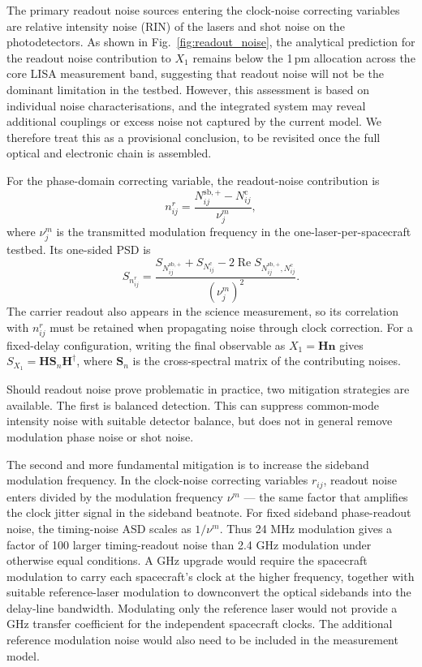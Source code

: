 


The primary readout noise sources entering the clock-noise correcting variables are relative intensity noise (RIN) of the lasers and shot noise on the photodetectors. As shown in Fig.~\ref{fig:readout_noise}, the analytical prediction for the readout noise contribution to $X_1$ remains below the 1\,pm allocation across the core LISA measurement band, suggesting that readout noise will not be the dominant limitation in the testbed. However, this assessment is based on individual noise characterisations, and the integrated system may reveal additional couplings or excess noise not captured by the current model. We therefore treat this as a provisional conclusion, to be revisited once the full optical and electronic chain is assembled.

For the phase-domain correcting variable, the readout-noise contribution is
\begin{equation*}
    n^r_{ij}=\frac{N^{\mathrm{sb,+}}_{ij}-N^{\mathrm c}_{ij}}{\nu_j^m},
\end{equation*}
where $\nu_j^m$ is the transmitted modulation frequency in the one-laser-per-spacecraft testbed. Its one-sided PSD is
\begin{equation*}
    S_{n^r_{ij}}=
    \frac{S_{N^{\mathrm{sb,+}}_{ij}}+S_{N^{\mathrm c}_{ij}}
    -2\operatorname{Re}S_{N^{\mathrm{sb,+}}_{ij},N^{\mathrm c}_{ij}}}
    {(\nu_j^m)^2}.
\end{equation*}
The carrier readout also appears in the science measurement, so its correlation with $n^r_{ij}$ must be retained when propagating noise through clock correction. For a fixed-delay configuration, writing the final observable as $X_1=\mathbf H\mathbf n$ gives $S_{X_1}=\mathbf H\mathbf S_n\mathbf H^\dagger$, where $\mathbf S_n$ is the cross-spectral matrix of the contributing noises.

Should readout noise prove problematic in practice, two mitigation strategies are available. The first is balanced detection. This can suppress common-mode intensity noise with suitable detector balance, but does not in general remove modulation phase noise or shot noise.

The second and more fundamental mitigation is to increase the sideband modulation frequency. In the clock-noise correcting variables $r_{ij}$, readout noise enters divided by the modulation frequency $\nu^m$ — the same factor that amplifies the clock jitter signal in the sideband beatnote. For fixed sideband phase-readout noise, the timing-noise ASD scales as $1/\nu^m$. Thus 24 MHz modulation gives a factor of 100 larger timing-readout noise than 2.4 GHz modulation under otherwise equal conditions. A GHz upgrade would require the spacecraft modulation to carry each spacecraft's clock at the higher frequency, together with suitable reference-laser modulation to downconvert the optical sidebands into the delay-line bandwidth. Modulating only the reference laser would not provide a GHz transfer coefficient for the independent spacecraft clocks. The additional reference modulation noise would also need to be included in the measurement model.

